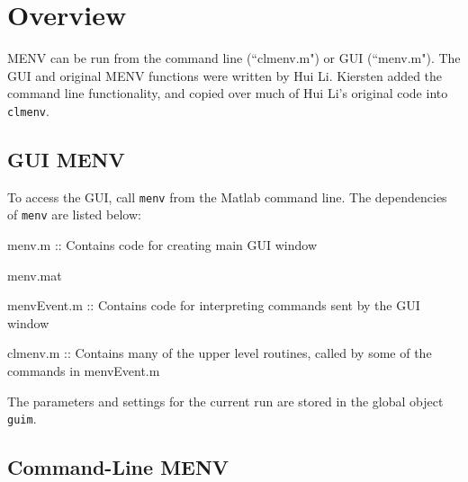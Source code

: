 \documentclass[../menv_main.tex]{subfiles}
\begin{document}
\section{Overview}

MENV can be run from the command line (``clmenv.m") or GUI (``menv.m"). The GUI and original MENV functions were written by Hui Li. Kiersten added the command line functionality, and copied over much of Hui Li's original code into \verb|clmenv|. 

\subsection{GUI MENV}

To access the GUI, call \verb|menv| from the Matlab command line. The dependencies of \verb|menv| are listed below:

\begin{itemized}
\item menv.m :: Contains code for creating main GUI window
\item menv.mat
\item menvEvent.m :: Contains code for interpreting commands sent by the GUI window
\item clmenv.m :: Contains many of the upper level routines, called by some of the commands in menvEvent.m
\end{itemized}

The parameters and settings for the current run are stored in the global object \verb|guim|.


\subsection{Command-Line MENV}
\end{document}
